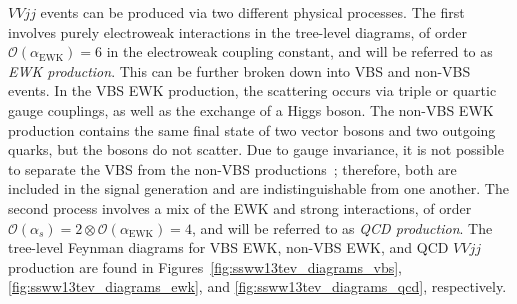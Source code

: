 $VVjj$ events can be produced via two different physical processes.
The first involves purely electroweak interactions in the tree-level diagrams, of order $\mathcal{O}(\alpha_{\textrm{EWK}}) = 6$ in the electroweak coupling constant, %
and will be referred to as \emph{EWK production}.
This can be further broken down into VBS and non-VBS events.
In the VBS EWK production, the scattering occurs via triple or quartic gauge couplings, as well as the exchange of a Higgs boson. %
The non-VBS EWK production contains the same final state of two vector bosons and two outgoing quarks, but the bosons do not scatter.
Due to gauge invariance, it is not possible to separate the VBS from the non-VBS productions~\cite{2006.isolating-vbs-lhc}; therefore, both are included in the signal generation and are indistinguishable from one another.
The second process involves a mix of the EWK and strong interactions, of order $\mathcal{O}(\alpha_s) = 2 \otimes \mathcal{O}(\alpha_{\textrm{EWK}}) = 4$, and will be referred to as \emph{QCD production}.
The tree-level Feynman diagrams for VBS EWK, non-VBS EWK, and QCD $VVjj$ production are found in Figures~\ref{fig:ssww13tev_diagrams_vbs}, \ref{fig:ssww13tev_diagrams_ewk}, and \ref{fig:ssww13tev_diagrams_qcd}, respectively.

